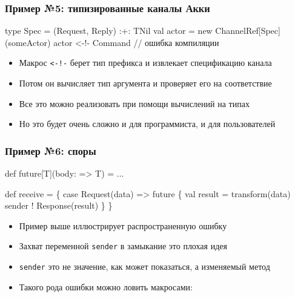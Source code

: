 \documentclass[svgnames,hyperref={bookmarks=false},11pt]{beamer}
\begin{document}
\begin{frame}[fragile]
\frametitle{Пример №5: типизированные каналы Акки}

\begin{semiverbatim}
type Spec = (Request, Reply) :+: TNil
val actor = new ChannelRef[Spec](someActor)
\alert{actor <-!- Command // ошибка компиляции}

\end{semiverbatim}

\begin{itemize}
\item Макрос \texttt{<-!-} берет тип префикса и извлекает спецификацию канала
\item Потом он вычисляет тип аргумента и проверяет его на соответствие
\item Все это можно реализовать при помощи вычислений на типах
\item Но это будет очень сложно и для программиста, и для пользователей
\end{itemize}
\end{frame}

\begin{frame}[fragile, t]
\frametitle{Пример №6: споры}

\begin{semiverbatim}
def future[T](body: => T) = ...

def receive = \{
  case Request(data) =>
    future \{
      val result = transform(data)
      sender ! Response(result)
    \}
\}

\end{semiverbatim}

\begin{itemize}
\item Пример выше иллюстрирует распространенную ошибку
\item Захват переменной \texttt{sender} в замыкание \text{\textendash} это плохая идея
\item \texttt{sender} это не значение, как может показаться, а изменяемый метод
\item Такого рода ошибки можно ловить макросами: 
\end{itemize}
\end{frame}
\end{document}
